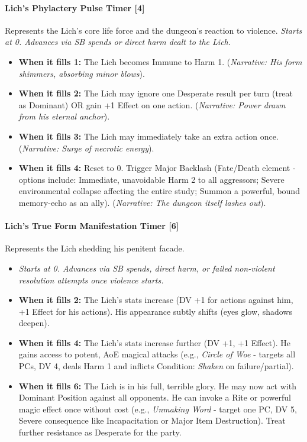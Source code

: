 \documentclass[18pt, letterpaper, twoside]{article}
\begin{document}
\paragraph{Lich's Phylactery Pulse Timer [4]}
Represents the Lich's core life force and the dungeon's reaction to violence. \emph{Starts at 0. Advances via SB spends or direct harm dealt to the Lich.}
\begin{itemize}
    \item \textbf{When it fills 1:} The Lich becomes Immune to Harm 1. (\emph{Narrative: His form shimmers, absorbing minor blows}).
    \item \textbf{When it fills 2:} The Lich may ignore one Desperate result per turn (treat as Dominant) OR gain +1 Effect on one action. (\emph{Narrative: Power drawn from his eternal anchor}).
    \item \textbf{When it fills 3:} The Lich may immediately take an extra action once. (\emph{Narrative: Surge of necrotic energy}).
    \item \textbf{When it fills 4:} Reset to 0. Trigger Major Backlash (Fate/Death element - options include: Immediate, unavoidable Harm 2 to all aggressors; Severe environmental collapse affecting the entire study; Summon a powerful, bound memory-echo as an ally). (\emph{Narrative: The dungeon itself lashes out}).
\end{itemize}

\paragraph{Lich's True Form Manifestation Timer [6]}
Represents the Lich shedding his penitent facade.
\begin{itemize}
    \item \emph{Starts at 0. Advances via SB spends, direct harm, or failed non-violent resolution attempts once violence starts.}
    \item \textbf{When it fills 2:} The Lich's stats increase (DV +1 for actions against him, +1 Effect for his actions). His appearance subtly shifts (eyes glow, shadows deepen).
    \item \textbf{When it fills 4:} The Lich's stats increase further (DV +1, +1 Effect). He gains access to potent, AoE magical attacks (e.g., \emph{Circle of Woe} - targets all PCs, DV 4, deals Harm 1 and inflicts Condition: \emph{Shaken} on failure/partial).
    \item \textbf{When it fills 6:} The Lich is in his full, terrible glory. He may now act with Dominant Position against all opponents. He can invoke a Rite or powerful magic effect once without cost (e.g., \emph{Unmaking Word} - target one PC, DV 5, Severe consequence like Incapacitation or Major Item Destruction). Treat further resistance as Desperate for the party.
\end{itemize}
\end{document}
